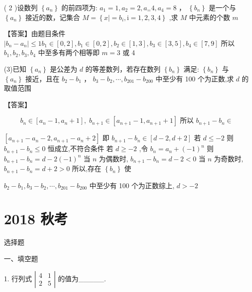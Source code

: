 \documentclass[10pt]{article}
\newcommand*\circled[1]{\tikz[baseline=(char.base)]{\node[shape=circle,draw,inner sep=1.5pt] (char) {\small #1};}}
\begin{document}
( 2 )设数列 \(\left\{  {a}_{n}\right\}\) 的前四项为: \({a}_{1} = 1,{a}_{2} = 2,{a}_{ = }4,{a}_{4} = 8\) ， \(\left\{  {b}_{n}\right\}\) 是一个与 \(\left\{  {a}_{n}\right\}\) 接近的数，记集合 \(M = \left\{  {x \mid   = {b}_{i},\mathrm{i} = 1,2,3,4}\right\}\) ,求 \(M\) 中元素的个数 \(m\)

【答案】由题目条件 \(\left| {{b}_{n} - {a}_{n}}\right|  \leq  1{b}_{1} \in  \left\lbrack  {0,2}\right\rbrack  ,{b}_{1} \in  \left\lbrack  {0,2}\right\rbrack  ,{b}_{2} \in  \left\lbrack  {1,3}\right\rbrack  ,{b}_{3} \in  \left\lbrack  {3,5}\right\rbrack  ,{b}_{4} \in  \left\lbrack  {7,9}\right\rbrack\) 所以 \({b}_{1},{b}_{2},{b}_{3},{b}_{4}\) 中至多有两个相等即 \(m = 3\) 或 4

(3)已知 \(\left\{  {a}_{n}\right\}\) 是公差为 \(d\) 的等差数列，若存在数列 \(\left\{  {b}_{n}\right\}\) 满足: \(\left\{  {b}_{n}\right\}\) 与 \(\left\{  {a}_{n}\right\}\) 接近，且在 \({b}_{2} - {b}_{1}\) ， \({b}_{3} - {b}_{2},\cdots ,{b}_{201} - {b}_{200}\) 中至少有 100 个为正数,求 \(d\) 的取值范围

【答案】

\[
{b}_{n} \in  \left\lbrack  {{a}_{n} - 1,{a}_{n} + 1}\right\rbrack  ,\;{b}_{n + 1} \in  \left\lbrack  {{a}_{n + 1} - 1,{a}_{n + 1} + 1}\right\rbrack  \text{ 所以 }{b}_{n + 1} - {b}_{n} \in
\]

\(\left\lbrack  {{a}_{n + 1} - {a}_{n} - 2,{a}_{n + 1} - {a}_{n} + 2}\right\rbrack\) 即 \({b}_{n + 1} - {b}_{n} \in  \left\lbrack  {d - 2,d + 2}\right\rbrack\)  \circled{1} 若 \(d \leq   - 2\) 则 \({b}_{n + 1} - {b}_{n} \leq  0\) 恒成立,不符合条件 \circled{2} 若 \(d \geq   - 2\) ,令 \({b}_{n} = {a}_{n} + {\left( -1\right) }^{n}\) 则 \({b}_{n + 1} - {b}_{n} = d - 2{\left( -1\right) }^{n}\) 当 \(n\) 为偶数时, \({b}_{n + 1} - {b}_{n} = d - 2 < 0\) 当 \(n\) 为奇数时, \({b}_{n + 1} - {b}_{n} = d + 2 > 0\) 所以,存在 \(\left\{  {b}_{n}\right\}\) 使

\({b}_{2} - {b}_{1},{b}_{3} - {b}_{2},\cdots ,{b}_{201} - {b}_{200}\) 中至少有 100 个为正数综上, \(d >  - 2\)

\section*{2018 秋考}

选择题

一、填空题

1. 行列式 \(\left| \begin{array}{ll} 4 & 1 \\  2 & 5 \end{array}\right|\) 的值为\_\_\_\_\_.
\end{document}
